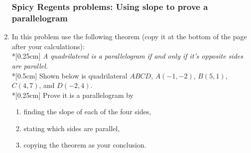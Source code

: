 \documentclass[12pt, twoside]{article}
\begin{document}
\begin{enumerate}
\subsubsection*{Spicy Regents problems: Using slope to prove a parallelogram}
\item In this problem use the following theorem (copy it at the bottom of the page after your calculations): \\*[0.25cm]
  \emph{A quadrilateral is a parallelogram if and only if it's opposite sides are parallel.}\\*[0.5cm]
  Shown below is quadrilateral $ABCD$, $A(-1,-2)$, $B(5,1)$, $C(4,7)$, and $D(-2,4)$. \\*[0.25cm]
  Prove it is a parallelogram by
  \begin{enumerate}
    \item finding the slope of each of the four sides,
    \item stating which sides are parallel,
    \item copying the theorem as your conclusion.
  \end{enumerate}
  \begin{flushright} %
  \end{flushright}

\newpage

\end{enumerate}
\end{document}
